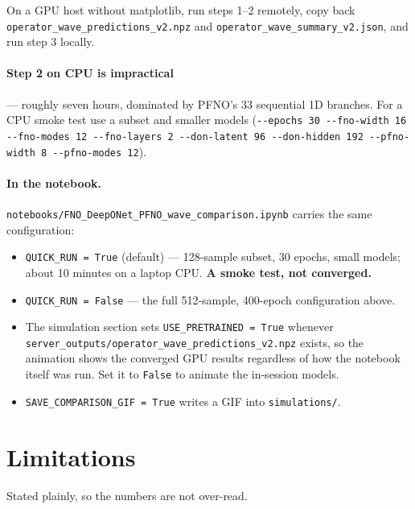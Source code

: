 \documentclass[11pt,a4paper]{article}
\newcommand{\bk}{\discretionary{}{}{}}
\begin{document}
On a GPU host without matplotlib, run steps 1--2 remotely, copy back
\texttt{operator\_wave\bk\_predictions\bk\_v2.npz} and
\texttt{operator\_wave\bk\_summary\bk\_v2.json}, and run step 3 locally.

\paragraph{Step 2 on CPU is impractical} --- roughly seven hours, dominated by
PFNO's 33 sequential 1D branches. For a CPU smoke test use a subset and smaller
models (\texttt{-{}-epochs 30 -{}-fno-width 16 -{}-fno-modes 12 -{}-fno-layers 2
-{}-don-latent 96 -{}-don-hidden 192 -{}-pfno-width 8 -{}-pfno-modes 12}).

\paragraph{In the notebook.}
\texttt{notebooks/FNO\_DeepONet\_PFNO\_wave\_comparison.ipynb} carries the same
configuration:

\begin{itemize}[leftmargin=*,itemsep=2pt]
\item \texttt{QUICK\_RUN = True} (default) --- 128-sample subset, 30 epochs,
small models; about 10 minutes on a laptop CPU. \textbf{A smoke test, not
converged.}
\item \texttt{QUICK\_RUN = False} --- the full 512-sample, 400-epoch
configuration above.
\item The simulation section sets \texttt{USE\_PRETRAINED = True} whenever
\texttt{server\_outputs/\bk operator\_wave\bk\_predictions\bk\_v2.npz} exists, so the
animation shows the converged GPU results regardless of how the notebook itself
was run. Set it to \texttt{False} to animate the in-session models.
\item \texttt{SAVE\_COMPARISON\_GIF = True} writes a GIF into
\texttt{simulations/}.
\end{itemize}

\section{Limitations}

Stated plainly, so the numbers are not over-read.
\end{document}
